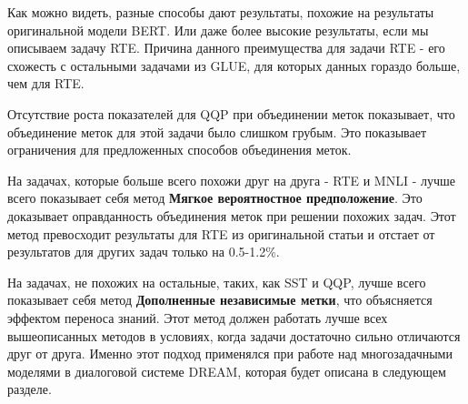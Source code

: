 Как можно видеть, разные способы дают результаты, похожие на результаты оригинальной модели BERT. Или даже более высокие результаты, если мы описываем задачу RTE. Причина данного преимущества для задачи RTE -  его схожесть с остальными задачами из GLUE, для которых данных гораздо больше, чем для RTE.

 Отсутствие роста показателей для QQP при объединении меток показывает, что объединение меток для этой задачи было слишком грубым. Это показывает ограничения для предложенных способов объединения меток.
 
На задачах, которые больше всего похожи друг на друга - RTE и MNLI - лучше всего показывает себя метод \textbf{Мягкое вероятностное предположение}. Это доказывает оправданность объединения меток при решении похожих задач. Этот метод превосходит результаты для RTE из оригинальной статьи и отстает от результатов для других задач только на 0.5-1.2\%.

На задачах, не похожих на остальные, таких, как SST и QQP, лучше всего показывает себя метод \textbf{Дополненные независимые метки}, что объясняется эффектом переноса знаний. Этот метод должен работать лучше всех вышеописанных методов в условиях, когда задачи достаточно сильно отличаются друг от друга. Именно этот подход применялся при работе над многозадачными моделями в диалоговой системе DREAM, которая будет описана в следующем разделе.

\clearpage
